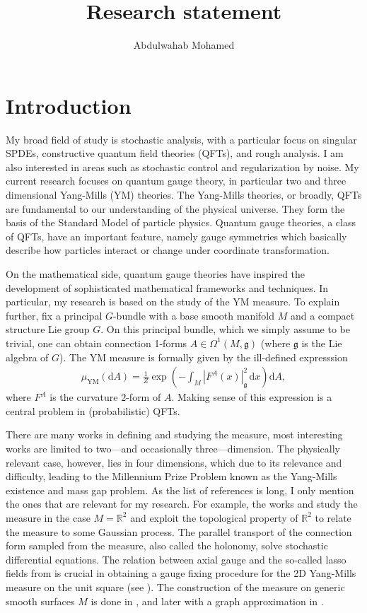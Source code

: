 \documentclass[12pt]{article}
\title{Research statement}
\author{Abdulwahab Mohamed}
\numberwithin{equation}{section}
\theoremstyle{definition}
\theoremstyle{remark}
\newcommand{\diff}{\mathrm{d}}
\newcommand{\R}{\mathbb R}
\newcommand{\1}{\mathbf 1}
\newcommand{\<}{\langle}
\renewcommand{\>}{\rangle}
\begin{document}
\maketitle


\section{Introduction}
My broad field of study is stochastic analysis, with a particular focus on singular SPDEs, constructive quantum field theories (QFTs), and rough analysis. I am also interested in  areas such as stochastic control and regularization by noise.
%
My current research focuses on quantum gauge theory, in particular two and three dimensional Yang-Mills (YM) theories. The Yang-Mills theories, or broadly,   QFTs are fundamental to our understanding of the physical universe. They form the basis of the Standard Model of particle physics. Quantum gauge theories, a class of QFTs, have an important feature, namely gauge symmetries which basically describe how particles interact or change under coordinate transformation. 

On the mathematical side, quantum gauge theories have inspired the development of sophisticated mathematical frameworks and techniques. In particular, my research is based on the study of the YM measure. To explain further, fix a principal $G$-bundle with a base smooth manifold $M$ and a compact structure Lie group $G$. On this principal bundle, which we simply assume to be trivial, one can obtain connection 1-forms $A\in \Omega^1(M,\mathfrak g)$ (where  $\mathfrak g$ is the Lie algebra of $G$).  The YM measure  is formally given by the ill-defined expresssion
\begin{align}\label{eq:YM_measure}
\mu_{\mathrm{YM}}(\diff A)=\frac 1 Z\exp\left(-\int_{M}|F^A(x)|_{\mathfrak g}^2\,\diff x\right)\diff A,
\end{align}
where $F^A$ is the curvature $2$-form of $A$. Making sense of this expression is a central problem in (probabilistic) QFTs. 

There are many works in defining and studying the measure, most interesting works are limited to two—and occasionally three—dimension. The physically relevant case, however, lies in four dimensions, which due to its relevance and difficulty, leading to the Millennium Prize Problem known as the Yang-Mills existence and mass gap problem. As the list of references is long, I only mention the ones that are relevant for my research.  For example, the works \cite{Driver89} and \cite{GKS89} study the measure in the case $M=\R^2$ and exploit the topological property of $\R^2$ to relate the measure to some Gaussian process. The parallel transport of the connection form sampled from the measure, also called the holonomy, solve stochastic differential equations. 
%
%
The relation between axial gauge and the so-called lasso fields from \cite{Driver89} is crucial in obtaining a gauge fixing procedure for the 2D Yang-Mills measure on the unit square (see ). The construction of the measure on generic smooth surfaces $M$ is done in  \cite{Sengupta97}, and later with a graph approximation in \cite{Levy03}. 
\end{document}
